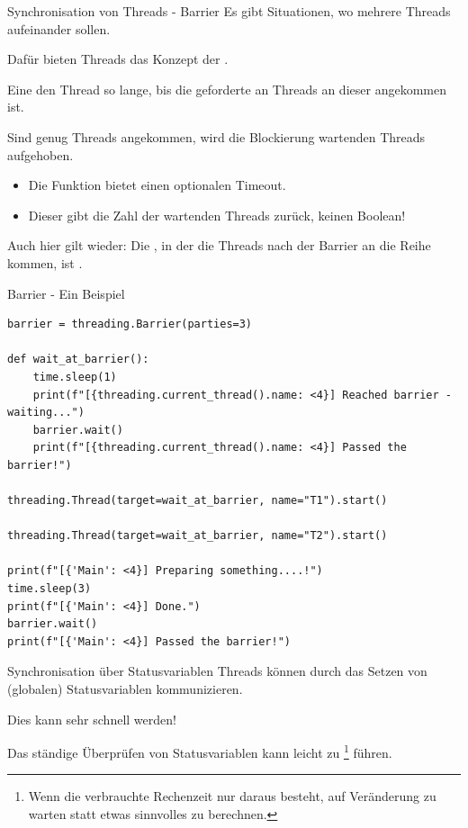 \documentclass[12pt, aspectratio=169, usepdftitle=false, handout]{beamer}
\newcommand{\pp}[1]{\lpl{#1}}
\begin{document}
\begin{frame}[fragile]{Synchronisation von Threads - Barrier}
        Es gibt Situationen, wo mehrere Threads aufeinander  sollen.

		\medskip
		
		Dafür bieten Threads das Konzept der .
		
		\pause
		\medskip
		
		Eine \pp{Barrier}  den Thread so lange, bis die geforderte  an Threads an dieser angekommen ist.
		
		\pause
		\medskip
		
		Sind genug Threads angekommen, wird die Blockierung  wartenden Threads aufgehoben.
		\begin{itemize}
			\item Die \pp{.wait()} Funktion bietet einen optionalen Timeout.
			\item Dieser gibt die Zahl der wartenden Threads zurück, keinen Boolean!
		\end{itemize}
		
		\pause
		
		Auch hier gilt wieder: Die , in der die Threads nach der Barrier an die Reihe kommen, ist .

\end{frame}


\begin{frame}[fragile]{Barrier - Ein Beispiel}
	\begin{lstlisting}[language=pytiny]
barrier = threading.Barrier(parties=3)

def wait_at_barrier():
    time.sleep(1)
    print(f"[{threading.current_thread().name: <4}] Reached barrier - waiting...")
    barrier.wait()
    print(f"[{threading.current_thread().name: <4}] Passed the barrier!")

threading.Thread(target=wait_at_barrier, name="T1").start()

threading.Thread(target=wait_at_barrier, name="T2").start()

print(f"[{'Main': <4}] Preparing something....!")
time.sleep(3)
print(f"[{'Main': <4}] Done.")
barrier.wait()
print(f"[{'Main': <4}] Passed the barrier!")
	\end{lstlisting}
\end{frame}


\begin{frame}[fragile]{Synchronisation über Statusvariablen}
        Threads können durch das Setzen von (globalen) Statusvariablen kommunizieren.

		\medskip
		
		Dies kann sehr schnell  werden!
		
		\medskip
		
		Das ständige Überprüfen von Statusvariablen kann leicht zu \footnote{Wenn die verbrauchte Rechenzeit nur daraus besteht, auf Veränderung zu warten statt etwas sinnvolles zu berechnen.} führen.

\end{frame}
\end{document}
